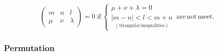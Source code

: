 \begin{equation}
\left(\begin{array}{ccc}
m & n & l\\
\mu & \nu & \lambda
\end{array}\right)=0\;\mathrm{if}\,\left\{ \begin{array}{l}
\mu+\nu+\lambda=0\\
\underset{\mathrm{(triangular\,inequalities)}}{\left|m-n\right|<l<m+n}
\end{array}\right.\,\mathrm{are\,not\,meet.}\,
\end{equation}



\subsubsection*{Permutation }
